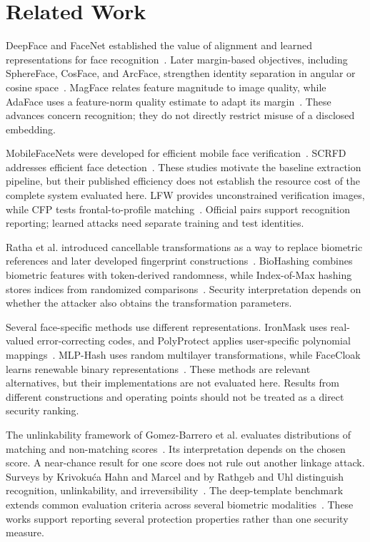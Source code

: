 \section{Related Work}\label{sec:related}

DeepFace and FaceNet established the value of alignment and learned representations for face recognition~\cite{deepface,facenet}. Later margin-based objectives, including SphereFace, CosFace, and ArcFace, strengthen identity separation in angular or cosine space~\cite{sphereface,cosface,arcface}. MagFace relates feature magnitude to image quality, while AdaFace uses a feature-norm quality estimate to adapt its margin~\cite{magface,adaface}. These advances concern recognition; they do not directly restrict misuse of a disclosed embedding.

MobileFaceNets were developed for efficient mobile face verification~\cite{chen2018mobilefacenet}. SCRFD addresses efficient face detection~\cite{guo2021scrfd}. These studies motivate the baseline extraction pipeline, but their published efficiency does not establish the resource cost of the complete system evaluated here. LFW provides unconstrained verification images, while CFP tests frontal-to-profile matching~\cite{huang2007lfw,sengupta2016cfp}. Official pairs support recognition reporting; learned attacks need separate training and test identities.


Ratha et al. introduced cancellable transformations as a way to replace biometric references and later developed fingerprint constructions~\cite{ratha2001enhancing,ratha2007cancelable}. BioHashing combines biometric features with token-derived randomness, while Index-of-Max hashing stores indices from randomized comparisons~\cite{teoh2004biohashing,iom2018}. Security interpretation depends on whether the attacker also obtains the transformation parameters.

Several face-specific methods use different representations. IronMask uses real-valued error-correcting codes, and PolyProtect applies user-specific polynomial mappings~\cite{ironmask,polyprotect}. MLP-Hash uses random multilayer transformations, while FaceCloak learns renewable binary representations~\cite{mlphash,facecloak}. These methods are relevant alternatives, but their implementations are not evaluated here. Results from different constructions and operating points should not be treated as a direct security ranking.

The unlinkability framework of Gomez-Barrero et al. evaluates distributions of matching and non-matching scores~\cite{gomezbarrero2018unlinkability}. Its interpretation depends on the chosen score. A near-chance result for one score does not rule out another linkage attack. Surveys by Krivoku\'{c}a Hahn and Marcel and by Rathgeb and Uhl distinguish recognition, unlinkability, and irreversibility~\cite{hahn2022survey,rathgeb2011survey}. The deep-template benchmark extends common evaluation criteria across several biometric modalities~\cite{benchmark2026}. These works support reporting several protection properties rather than one security measure.


